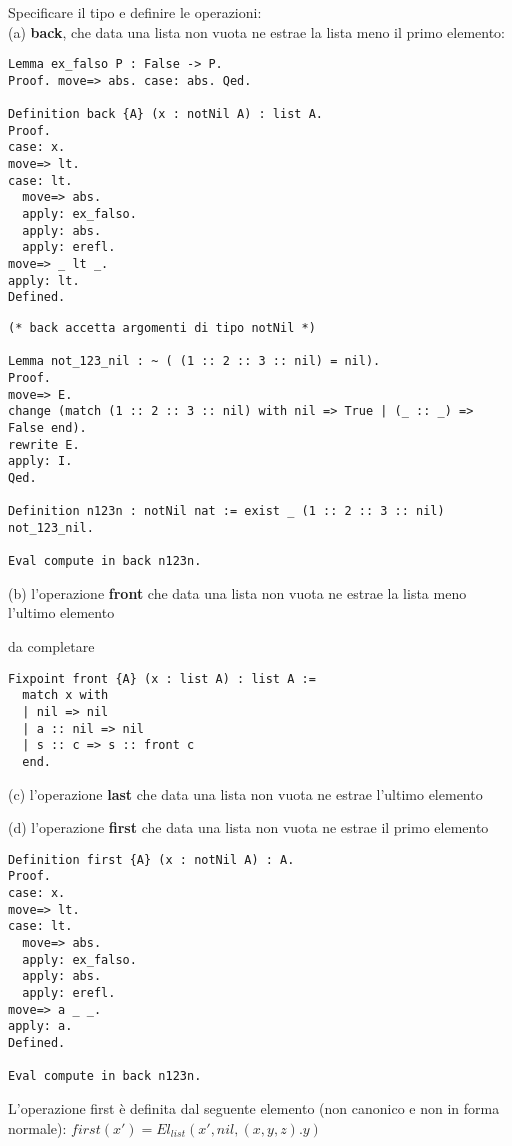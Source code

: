 Specificare il tipo e definire le operazioni: \\

(a) \textbf{back}, che data una lista non vuota ne estrae la lista meno il primo elemento:

\begin{lstlisting}[language=Coq]
Lemma ex_falso P : False -> P.
Proof. move=> abs. case: abs. Qed.

Definition back {A} (x : notNil A) : list A.
Proof.
case: x.
move=> lt.
case: lt.
  move=> abs.
  apply: ex_falso.
  apply: abs.
  apply: erefl.
move=> _ lt _.
apply: lt.
Defined.
\end{lstlisting}

\begin{lstlisting}[language=Coq]
(* back accetta argomenti di tipo notNil *)

Lemma not_123_nil : ~ ( (1 :: 2 :: 3 :: nil) = nil).
Proof.
move=> E.
change (match (1 :: 2 :: 3 :: nil) with nil => True | (_ :: _) => False end).
rewrite E.
apply: I.
Qed.

Definition n123n : notNil nat := exist _ (1 :: 2 :: 3 :: nil) not_123_nil.

Eval compute in back n123n.
\end{lstlisting}

(b) l'operazione \textbf{front} che data una lista non vuota ne estrae la lista meno
l'ultimo elemento

da completare

\begin{lstlisting}[language=Coq]
Fixpoint front {A} (x : list A) : list A :=
  match x with
  | nil => nil
  | a :: nil => nil
  | s :: c => s :: front c
  end.
\end{lstlisting}

(c) l'operazione \textbf{last} che data una lista non vuota ne estrae l'ultimo elemento

(d) l'operazione \textbf{first} che data una lista non vuota ne estrae il primo
elemento

\begin{lstlisting}[language=Coq]
Definition first {A} (x : notNil A) : A.
Proof.
case: x.
move=> lt.
case: lt.
  move=> abs.
  apply: ex_falso.
  apply: abs.
  apply: erefl.
move=> a _ _.
apply: a.
Defined.

Eval compute in back n123n.
\end{lstlisting}

L'operazione first è definita dal seguente elemento (non canonico e non in
forma normale): $first(x') = El_{list}(x',nil,(x,y,z).y)$

